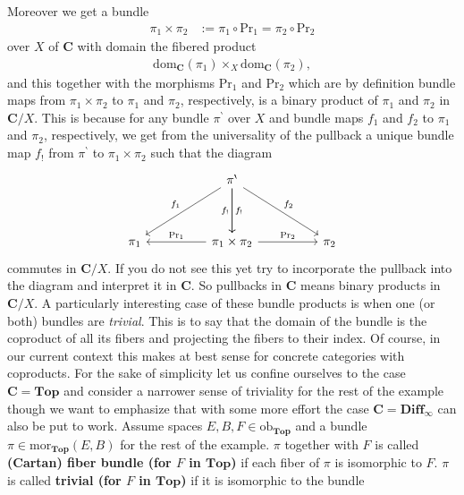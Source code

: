 \begin{exa}[Bundles 1]
Moreover we get a bundle
\begin{align*}
  \pi_{1}
  \times
  \pi_{2}
  &:=
  \pi_{1}
  \circ
  \mathrm{Pr}_{1}
  =
  \pi_{2}
  \circ
  \mathrm{Pr}_{2}
\end{align*}
over $X$ of $\mathbf{C}$ with domain the fibered product
\begin{align*}
  \mathrm{dom}_{\mathbf{C}}(\pi_{1})
  \times_{X}
  \mathrm{dom}_{\mathbf{C}}(\pi_{2}),
\end{align*}
and this together with the morphisms $\mathrm{Pr}_{1}$ and $\mathrm{Pr}_{2}$ which are by definition bundle maps from $\pi_{1} \times \pi_{2}$ to $\pi_{1}$ and $\pi_{2}$, respectively, is a binary product of $\pi_{1}$ and $\pi_{2}$ in $\mathbf{C} \slash X$. This is because for any bundle $\pi^{\backprime}$ over $X$ and bundle maps $f_{1}$ and $f_{2}$ to $\pi_{1}$ and $\pi_{2}$, respectively, we get from the universality of the pullback a unique bundle map $f_{!}$ from $\pi^{\backprime}$ to $\pi_{1} \times \pi_{2}$ such that the diagram
\[
\begin{tikzcd}[sep=huge]
  &
  \pi^{\backprime}
  \arrow{dr}{f_{2}}
  \arrow{d}{f_{!}}
  \arrow[swap]{d}{f_{!}}
  \arrow[swap]{dl}{f_{1}}
  &
  \\
  \pi_{1}
  &
  \pi_{1} \times \pi_{2}
  \arrow{r}{\mathrm{Pr}_{2}}
  \arrow[swap]{l}{\mathrm{Pr}_{1}}
  &
  \pi_{2}
\end{tikzcd}
\]
commutes in $\mathbf{C} \slash X$. If you do not see this yet try to incorporate the pullback into the diagram and interpret it in $\mathbf{C}$. So pullbacks in $\mathbf{C}$ means binary products in $\mathbf{C} \slash X$. A particularly interesting case of these bundle products is when one (or both) bundles are \textit{trivial}. This is to say that the domain of the bundle is the coproduct of all its fibers and projecting the fibers to their index. Of course, in our current context this makes at best sense for concrete categories with coproducts. For the sake of simplicity let us confine ourselves to the case $\mathbf{C} = \mathbf{Top}$ and consider a narrower sense of triviality for the rest of the example though we want to emphasize that with some more effort the case $\mathbf{C} = \mathbf{Diff}_{\infty}$ can also be put to work. Assume spaces $E,B,F \in \mathrm{ob}_{\mathbf{Top}}$ and a bundle $\pi \in \mathrm{mor}_{\mathbf{Top}}(E,B)$ for the rest of the example. $\pi$ together with $F$ is called \textbf{(Cartan) fiber bundle (for $F$ in $\mathbf{Top}$)} if each fiber of $\pi$ is isomorphic to $F$. $\pi$ is called \textbf{trivial (for $F$ in $\mathbf{Top}$)} if it is isomorphic to the bundle

\end{exa}
